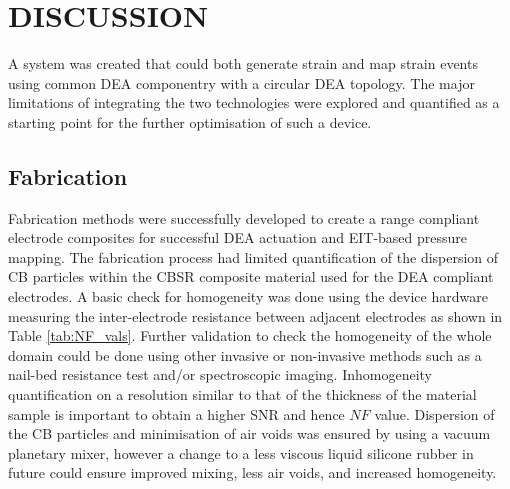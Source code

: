 \section{DISCUSSION}
\label{sec:concs_disc}
A system was created that could both generate strain and map strain events using common DEA componentry with a circular DEA topology. The major limitations of integrating the two technologies were explored and quantified as a starting point for the further optimisation of such a device. 


\subsection{Fabrication}
Fabrication methods were successfully developed to create a range compliant electrode composites for successful DEA actuation and EIT-based pressure mapping. The fabrication process had limited quantification of the dispersion of CB particles within the CBSR composite material used for the DEA compliant electrodes. A basic check for homogeneity was done using the device hardware measuring the inter-electrode resistance between adjacent electrodes as shown in Table \ref{tab:NF_vals}. Further validation to check the homogeneity of the whole domain could be done using other invasive or non-invasive methods such as a nail-bed resistance test and/or spectroscopic imaging. Inhomogeneity quantification on a resolution similar to that of the thickness of the material sample is important to obtain a higher SNR and hence $N\!F$ value. Dispersion of the CB particles and minimisation of air voids was ensured by using a vacuum planetary mixer, however a change to a less viscous liquid silicone rubber in future could ensure improved mixing, less air voids, and increased homogeneity. 

